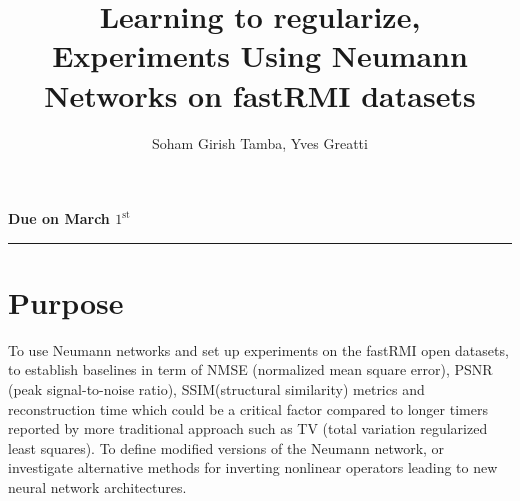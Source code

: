 \documentclass[12pt,twoside]{article}
\title{Learning to regularize, Experiments Using Neumann Networks on fastRMI datasets}
\author{Soham Girish Tamba, Yves Greatti}
\date{}
\begin{document}
\maketitle
\textbf{Due on March $1^{\text{st}}$}

\noindent\rule{\textwidth}{0.4pt}

\section{Purpose}
To use Neumann networks  and set up experiments on the fastRMI open datasets, 
to establish baselines in term of NMSE (normalized mean square error), PSNR (peak signal-to-noise ratio), SSIM(structural similarity) metrics and reconstruction time 
which could be a critical factor compared to longer timers reported by more traditional  approach such as TV (total variation regularized least squares).
To define modified versions of the Neumann network, or investigate alternative methods for inverting nonlinear operators leading to new neural network architectures.
\end{document}
